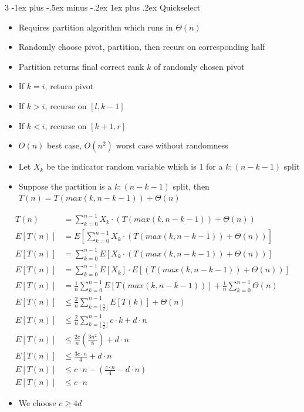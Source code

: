 \documentclass[10pt, landscape]{article}
\makeatletter
\renewcommand{\subsection}{\@startsection{subsection}{3}{0mm}%
                                {-1ex plus -.5ex minus -.2ex}%
                                {1ex plus .2ex}%
                                {\normalfont\small\bfseries}}%
\makeatother
\begin{document}
\begin{multicols*}{3}
\subsection{Quickselect}
\begin{itemize}
    \item Requires partition algorithm which runs in $\Theta(n)$
    \item Randomly choose pivot, partition, then recurs on corresponding half
    \item Partition returns final correct rank $k$ of randomly chosen pivot
    \item If $k=i$, return pivot
    \item If $k>i$, recurse on $[l, k-1]$
    \item If $k<i$, recurse on $[k+1, r]$
    \item $O(n)$ best case, $O(n^2)$ worst case without randomness
    \item Let $X_k$ be the indicator random variable which is 1 for a $k:(n-k-1)$ split
    \item Suppose the partition is a $k:(n-k-1)$ split, then $T(n)=T(max(k,n-k-1))+\Theta(n)$
\end{itemize}
\begin{align*}
T(n)&=\sum_{k=0}^{n-1}X_k \cdot (T(max(k,n-k-1))+\Theta(n)) \\
E[T(n)]&=E[\sum_{k=0}^{n-1}X_k \cdot (T(max(k,n-k-1))+\Theta(n))] \\
E[T(n)]&=\sum_{k=0}^{n-1}E[X_k \cdot (T(max(k,n-k-1))+\Theta(n))] \\
E[T(n)]&=\sum_{k=0}^{n-1} E[X_k] \cdot E[(T(max(k,n-k-1))+\Theta(n))] \\
E[T(n)]&=\frac{1}{n}\sum_{k=0}^{n-1}E[T(max(k,n-k-1))]+\frac{1}{n}\sum_{k=0}^{n-1}\Theta(n) \\
E[T(n)]&\leq\frac{2}{n}\sum_{k=\lfloor\frac{n}{2}\rfloor}^{n-1}E[T(k)]+\Theta(n) \\
E[T(n)]&\leq\frac{2}{n}\sum_{k=\lfloor\frac{n}{2}\rfloor}^{n-1}c\cdot k+d\cdot n \\
E[T(n)]&\leq\frac{2c}{n}(\frac{3n^2}{8})+d \cdot n \\
E[T(n)]&\leq\frac{3c \cdot n}{4}+d\cdot n \\
E[T(n)]&\leq c \cdot n - (\frac{c \cdot n}{4} - d \cdot n) \\ 
E[T(n)]&\leq c \cdot n
\end{align*}
\begin{itemize}
    \item We choose $c \geq 4d$
\end{itemize}


\end{multicols*}
\end{document}
